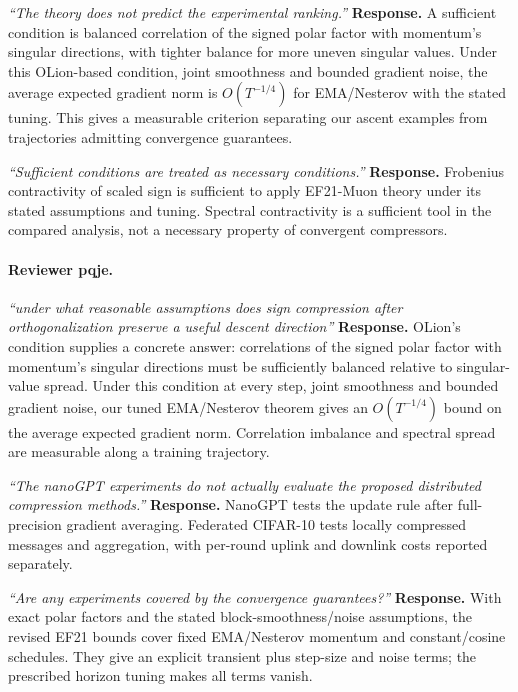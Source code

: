 \noindent\emph{``The theory does not predict the experimental ranking.''}
\textbf{Response.} A sufficient condition is balanced correlation of the signed polar factor with momentum's singular directions, with tighter balance for more uneven singular values. Under this OLion-based condition, joint smoothness and bounded gradient noise, the average expected gradient norm is $O(T^{-1/4})$ for EMA/Nesterov with the stated tuning. This gives a measurable criterion separating our ascent examples from trajectories admitting convergence guarantees.

\noindent\emph{``Sufficient conditions are treated as necessary conditions.''}
\textbf{Response.} Frobenius contractivity of scaled sign is sufficient to apply EF21-Muon theory under its stated assumptions and tuning. Spectral contractivity is a sufficient tool in the compared analysis, not a necessary property of convergent compressors.

\paragraph{Reviewer pqje.}
\noindent\emph{``under what reasonable assumptions does sign compression after orthogonalization preserve a useful descent direction''}
\textbf{Response.} OLion's condition supplies a concrete answer: correlations of the signed polar factor with momentum's singular directions must be sufficiently balanced relative to singular-value spread. Under this condition at every step, joint smoothness and bounded gradient noise, our tuned EMA/Nesterov theorem gives an $O(T^{-1/4})$ bound on the average expected gradient norm. Correlation imbalance and spectral spread are measurable along a training trajectory.

\noindent\emph{``The nanoGPT experiments do not actually evaluate the proposed distributed compression methods.''}
\textbf{Response.} NanoGPT tests the update rule after full-precision gradient averaging. Federated CIFAR-10 tests locally compressed messages and aggregation, with per-round uplink and downlink costs reported separately.

\noindent\emph{``Are any experiments covered by the convergence guarantees?''}
\textbf{Response.} With exact polar factors and the stated block-smoothness/noise assumptions, the revised EF21 bounds cover fixed EMA/Nesterov momentum and constant/cosine schedules. They give an explicit transient plus step-size and noise terms; the prescribed horizon tuning makes all terms vanish.

